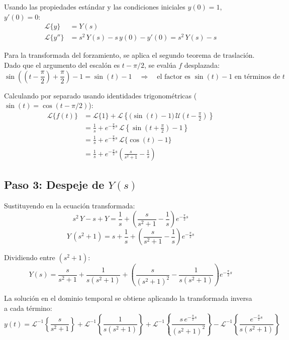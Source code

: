 \documentclass[12pt, a4paper]{article}
\newcommand{\Lap}{\mathcal{L}}
\newcommand{\U}{\mathcal{U}}
\begin{document}
Usando las propiedades estándar y las condiciones iniciales $y(0) = 1$, $y'(0) = 0$:
\begin{align*}
    \Lap\{y\}   &= Y(s) \\
    \Lap\{y''\} &= s^2\,Y(s) - s\,y(0) - y'(0) = s^2\,Y(s) - s
\end{align*}

Para la transformada del forzamiento, se aplica el segundo teorema de traslación. Dado que el argumento del escalón es $t - \pi/2$, se evalúa $f$ desplazada:
\[
    \sin\!\left(\left(t - \frac{\pi}{2}\right) + \frac{\pi}{2}\right) - 1
    = \sin(t) - 1
    \quad \Longrightarrow \quad
    \text{el factor es }\sin(t) - 1\text{ en términos de }t
\]

Calculando por separado usando identidades trigonométricas ($\sin(t) = \cos(t - \pi/2)$):
\begin{align*}
    \Lap\{f(t)\}
    &= \Lap\{1\} + \Lap\!\left\{\bigl(\sin(t)-1\bigr)\,\U\!\left(t-\tfrac{\pi}{2}\right)\right\} \\[4pt]
    &= \frac{1}{s}
      + e^{-\frac{\pi}{2}s}\,\Lap\!\left\{\sin\!\left(t+\tfrac{\pi}{2}\right) - 1\right\} \\[4pt]
    &= \frac{1}{s}
      + e^{-\frac{\pi}{2}s}\,\Lap\{\cos(t) - 1\} \\[4pt]
    &= \frac{1}{s}
      + e^{-\frac{\pi}{2}s}\left(\frac{s}{s^2+1} - \frac{1}{s}\right)
\end{align*}

\subsection{Paso 3: Despeje de \texorpdfstring{$Y(s)$}{Y(s)}}

Sustituyendo en la ecuación transformada:
\[
    s^2\,Y - s + Y = \frac{1}{s} + \left(\frac{s}{s^2+1} - \frac{1}{s}\right)e^{-\frac{\pi}{2}s}
\]
\[
    Y\,(s^2 + 1) = s + \frac{1}{s} + \left(\frac{s}{s^2+1} - \frac{1}{s}\right)e^{-\frac{\pi}{2}s}
\]

Dividiendo entre $(s^2 + 1)$:
\[
    Y(s) = \frac{s}{s^2+1} + \frac{1}{s(s^2+1)}
           + \left(\frac{s}{(s^2+1)^2} - \frac{1}{s(s^2+1)}\right)e^{-\frac{\pi}{2}s}
\]

La solución en el dominio temporal se obtiene aplicando la transformada inversa a cada término:
\[
    y(t) = \Lap^{-1}\!\left\{\frac{s}{s^2+1}\right\}
         + \Lap^{-1}\!\left\{\frac{1}{s(s^2+1)}\right\}
         + \Lap^{-1}\!\left\{\frac{s\,e^{-\frac{\pi}{2}s}}{(s^2+1)^2}\right\}
         - \Lap^{-1}\!\left\{\frac{e^{-\frac{\pi}{2}s}}{s(s^2+1)}\right\}
\]
\end{document}
